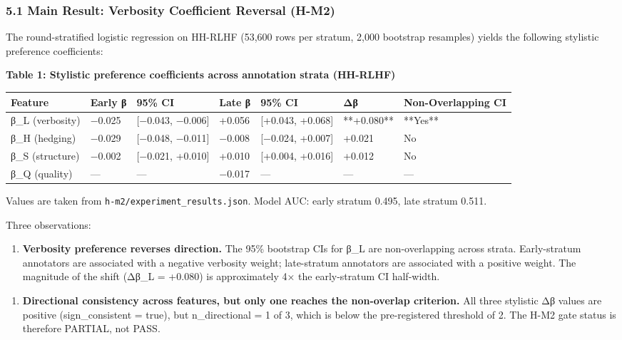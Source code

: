 
\subsubsection{5.1 Main Result: Verbosity Coefficient Reversal (H-M2)}

The round-stratified logistic regression on HH-RLHF (53,600 rows per stratum, 2,000 bootstrap resamples) yields the following stylistic preference coefficients:

\textbf{Table 1: Stylistic preference coefficients across annotation strata (HH-RLHF)}

\begin{table}[htbp]
\centering
\begin{tabular}{lllllll}
\toprule
Feature & Early β & 95\% CI & Late β & 95\% CI & Δβ & Non-Overlapping CI \\
\midrule
β_L (verbosity) & −0.025 & [−0.043, −0.006] & +0.056 & [+0.043, +0.068] & **+0.080** & **Yes** \\
β_H (hedging) & −0.029 & [−0.048, −0.011] & −0.008 & [−0.024, +0.007] & +0.021 & No \\
β_S (structure) & −0.002 & [−0.021, +0.010] & +0.010 & [+0.004, +0.016] & +0.012 & No \\
β_Q (quality) & — & — & −0.017 & — & — & — \\
\bottomrule
\end{tabular}
\end{table}

Values are taken from \texttt{h-m2/experiment_results.json}. Model AUC: early stratum 0.495, late stratum 0.511.

Three observations:

\begin{enumerate}
\item \textbf{Verbosity preference reverses direction.} The 95\% bootstrap CIs for β_L are non-overlapping across strata. Early-stratum annotators are associated with a negative verbosity weight; late-stratum annotators are associated with a positive weight. The magnitude of the shift (Δβ_L = +0.080) is approximately 4× the early-stratum CI half-width.
\end{enumerate}

\begin{enumerate}
\item \textbf{Directional consistency across features, but only one reaches the non-overlap criterion.} All three stylistic Δβ values are positive (sign_consistent = true), but n_directional = 1 of 3, which is below the pre-registered threshold of 2. The H-M2 gate status is therefore PARTIAL, not PASS.
\end{enumerate}

